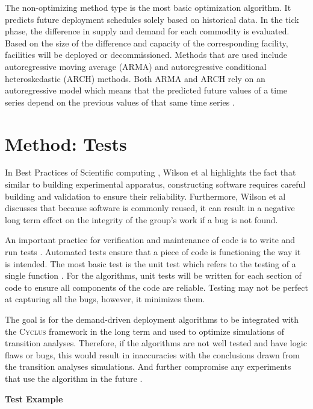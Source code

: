 \documentclass{anstrans}
\newcommand{\Cyclus}{\textsc{Cyclus}\xspace}%
\begin{document}
The non-optimizing method type is the most basic optimization algorithm. It predicts future deployment schedules solely based on historical data. In the tick phase, the difference in supply and demand for each commodity is evaluated. Based on the size of the difference and capacity of the corresponding facility, facilities will be deployed or decommissioned. Methods that are used include autoregressive moving average (ARMA) and autoregressive conditional heteroskedastic (ARCH) methods. Both ARMA and ARCH rely on an autoregressive model which means that the predicted future values of a time series depend on the previous values of that same time series \cite{scopatz_technical_2016}.

\section{Method: Tests}
In Best Practices of Scientific computing \cite{wilson_best_2014}, Wilson et al highlights the fact that similar to building experimental apparatus, constructing software requires careful building and validation to ensure their reliability. Furthermore, Wilson et al discusses that because software is commonly reused, it can result in a negative long term effect on the integrity of the group's work if a bug is not found. 

An important practice for verification and maintenance of code is to write and run tests \cite{wilson_best_2014}. Automated tests ensure that a piece of code is functioning the way it is intended. The most basic test is the unit test which refers to the testing of a single function \cite{wilson_best_2014}. For the algorithms, unit tests will be written for each section of code to ensure all components of the code are reliable. Testing may not be perfect at capturing all the bugs, however, it minimizes them. 

The goal is for the demand-driven deployment algorithms to be integrated with the \Cyclus framework in the long term and used to optimize simulations of transition analyses. Therefore, if the algorithms are not well tested and have logic flaws or bugs, this would result in inaccuracies with the conclusions drawn from the transition analyses simulations. And further compromise any experiments that use the algorithm in the future \cite{wilson_best_2014}. 

\noindent \textbf{Test Example} 
\end{document}
